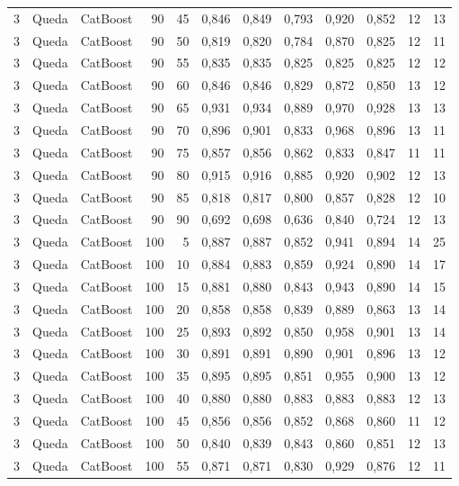 \begin{longtable}{@{}rllrrrrrrrrr@{}}
3 & Queda & CatBoost & 90 & 45 & 0,846 & 0,849 & 0,793 & 0,920 & 0,852 & 12 & 13 \\
3 & Queda & CatBoost & 90 & 50 & 0,819 & 0,820 & 0,784 & 0,870 & 0,825 & 12 & 11 \\
3 & Queda & CatBoost & 90 & 55 & 0,835 & 0,835 & 0,825 & 0,825 & 0,825 & 12 & 12 \\
3 & Queda & CatBoost & 90 & 60 & 0,846 & 0,846 & 0,829 & 0,872 & 0,850 & 13 & 12 \\
3 & Queda & CatBoost & 90 & 65 & 0,931 & 0,934 & 0,889 & 0,970 & 0,928 & 13 & 13 \\
3 & Queda & CatBoost & 90 & 70 & 0,896 & 0,901 & 0,833 & 0,968 & 0,896 & 13 & 11 \\
3 & Queda & CatBoost & 90 & 75 & 0,857 & 0,856 & 0,862 & 0,833 & 0,847 & 11 & 11 \\
3 & Queda & CatBoost & 90 & 80 & 0,915 & 0,916 & 0,885 & 0,920 & 0,902 & 12 & 13 \\
3 & Queda & CatBoost & 90 & 85 & 0,818 & 0,817 & 0,800 & 0,857 & 0,828 & 12 & 10 \\
3 & Queda & CatBoost & 90 & 90 & 0,692 & 0,698 & 0,636 & 0,840 & 0,724 & 12 & 13 \\
3 & Queda & CatBoost & 100 & 5 & 0,887 & 0,887 & 0,852 & 0,941 & 0,894 & 14 & 25 \\
3 & Queda & CatBoost & 100 & 10 & 0,884 & 0,883 & 0,859 & 0,924 & 0,890 & 14 & 17 \\
3 & Queda & CatBoost & 100 & 15 & 0,881 & 0,880 & 0,843 & 0,943 & 0,890 & 14 & 15 \\
3 & Queda & CatBoost & 100 & 20 & 0,858 & 0,858 & 0,839 & 0,889 & 0,863 & 13 & 14 \\
3 & Queda & CatBoost & 100 & 25 & 0,893 & 0,892 & 0,850 & 0,958 & 0,901 & 13 & 14 \\
3 & Queda & CatBoost & 100 & 30 & 0,891 & 0,891 & 0,890 & 0,901 & 0,896 & 13 & 12 \\
3 & Queda & CatBoost & 100 & 35 & 0,895 & 0,895 & 0,851 & 0,955 & 0,900 & 13 & 12 \\
3 & Queda & CatBoost & 100 & 40 & 0,880 & 0,880 & 0,883 & 0,883 & 0,883 & 12 & 13 \\
3 & Queda & CatBoost & 100 & 45 & 0,856 & 0,856 & 0,852 & 0,868 & 0,860 & 11 & 12 \\
3 & Queda & CatBoost & 100 & 50 & 0,840 & 0,839 & 0,843 & 0,860 & 0,851 & 12 & 13 \\
3 & Queda & CatBoost & 100 & 55 & 0,871 & 0,871 & 0,830 & 0,929 & 0,876 & 12 & 11 \\

\end{longtable}

